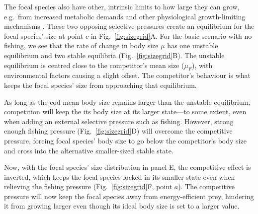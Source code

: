 \documentclass[9pt,twocolumn,twoside]{pnas-new}
\begin{document}
 The focal species also have other, intrinsic limits to how large they can grow, e.g.\ from increased metabolic demands and other physiological growth-limiting mechanisms \citep{Metcalfe2003}. These two opposing selective pressures create an equilibrium for the focal species' size at point $c$ in Fig.~\ref{fig:sizegrid}A. For the basic scenario with no fishing, we see that the rate of change in body size $\mu$ has one unstable equilibrium and two stable equilibria (Fig.~\ref{fig:sizegrid}B). The unstable equilibrium is centred close to the competitor's mean size ($\mu_{F}$), with environmental factors causing a slight offset. The competitor's behaviour is what keeps the focal species' size from approaching that equilibrium. 
 
 As long as the cod mean body size remains larger than the unstable equilibrium, competition will keep the its body size at its larger state---to some extent, even when adding an external selective pressure such as fishing. However, strong enough fishing pressure (Fig.~\ref{fig:sizegrid}D) will overcome the competitive pressure, forcing focal species' body size to go below the competitor's body size and cross into the alternative smaller-sized stable state. 
 
 Now, with the focal species' size distribution in panel E, the competitive effect is inverted, which keeps the focal species locked in its smaller state even when relieving the fishing pressure (Fig.~\ref{fig:sizegrid}F, point $a$). The competitive pressure will now keep the focal species away from energy-efficient prey, hindering it from growing larger even though its ideal body size is set to a larger value.

\end{document}
